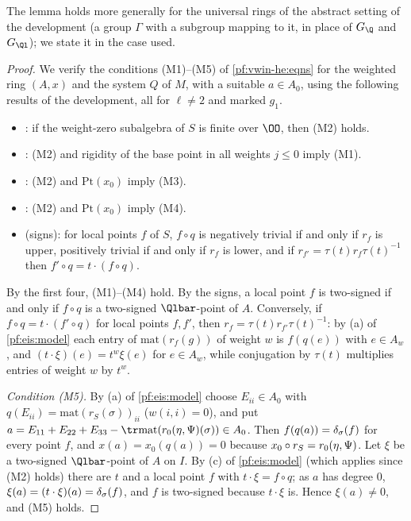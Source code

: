 The lemma holds more generally for the universal rings of the abstract setting of the development (a group $\Gamma$ with a
subgroup mapping to it, in place of $G_\Q$ and $G_{\Ql}$); we state it in the case used.

\begin{proof}
We verify the conditions (M1)--(M5) of \cref{pf:vwin-he:eqns} for the weighted ring $(A,x)$ and the system $Q$ of $M$, with a
suitable $a\in A_0$, using the following results of the development, all for $\ell\ne2$ and marked $g_1$.
\begin{itemize}
\item {}: if the weight-zero subalgebra of $S$ is finite
  over $\OO$, then (M2) holds.
\item {}: (M2) and rigidity of the base point in all weights
  $j\le0$ imply (M1).
\item {}: (M2) and $\mathrm{Pt}(x_0)$ imply (M3).
\item {}: (M2) and $\mathrm{Pt}(x_0)$ imply (M4).
\item {} (signs): for local points $f$ of $S$, $f\circ q$ is negatively trivial if and only if
  $r_f$ is upper, positively trivial if and only if $r_f$ is lower, and if $r_{f'}=\tau(t)r_f\tau(t)^{-1}$ then
  $f'\circ q=t\cdot(f\circ q)$.
\end{itemize}
By the first four, (M1)--(M4) hold. By the signs, a local point $f$ is two-signed if and only if $f\circ q$ is a two-signed
$\Qlbar$-point of $A$. Conversely, if $f\circ q=t\cdot(f'\circ q)$ for local points $f,f'$, then $r_f=\tau(t)r_{f'}\tau(t)^{-1}$: by
(a) of \cref{pf:eis:model} each entry of $\mathrm{mat}(r_f(g))$ of weight $w$ is $f(q(e))$ with $e\in A_w$, and
$(t\cdot\xi)(e)=t^w\xi(e)$ for $e\in A_w$, while conjugation by $\tau(t)$ multiplies entries of weight $w$ by $t^w$.

\emph{Condition (M5).} By (a) of \cref{pf:eis:model} choose $E_{ii}\in A_0$ with $q(E_{ii})=\mathrm{mat}(r_S(\sigma))_{ii}$
($w(i,i)=0$), and put $a=E_{11}+E_{22}+E_{33}-\tr\mathrm{mat}(\eisrz(\eta,\Psi)(\sigma))\in A_0$. Then $f(q(a))=\delta_\sigma(f)$ for
every point $f$, and $x(a)=x_0(q(a))=0$ because $x_0\circ r_S=r_0(\eta,\Psi)$. Let $\xi$ be a two-signed $\Qlbar$-point of $A$ on
$I$. By (c) of \cref{pf:eis:model} (which applies since (M2) holds) there are $t$ and a local point $f$ with
$t\cdot\xi=f\circ q$; as $a$ has degree $0$, $\xi(a)=(t\cdot\xi)(a)=\delta_\sigma(f)$, and $f$ is two-signed because $t\cdot\xi$ is.
Hence $\xi(a)\ne0$, and (M5) holds.


\end{proof}
